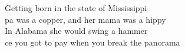 \songwordfb{} Getting born in the state of Mississippi \\
pa was a copper, and her mama was a hippy \\
\songwordfb{} In Alabama she would swing a hammer \\
ce you got to pay when you break the panorama \\














